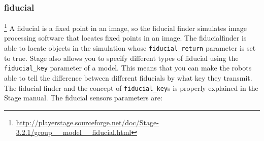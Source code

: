 \documentclass[a4paper]{report}
\begin{document}
\subsubsection{fiducial} \footnote{\url{http://playerstage.sourceforge.net/doc/Stage-3.2.1/group__model__fiducial.html}} 
A fiducial is a fixed point in an image, so the fiducial finder simulates image processing software that locates fixed points in an image. The fiducialfinder is able to locate objects in the simulation whose \verb|fiducial_return| parameter is set to true. Stage also allows you to specify different types of fiducial using the \verb|fiducial_key| parameter of a model. This means that you can make the robots able to tell the difference between different fiducials by what key they transmit. The fiducial finder and the concept of \verb|fiducial_key|s is properly explained in the Stage manual. The fiducial sensors parameters are:
\end{document}
